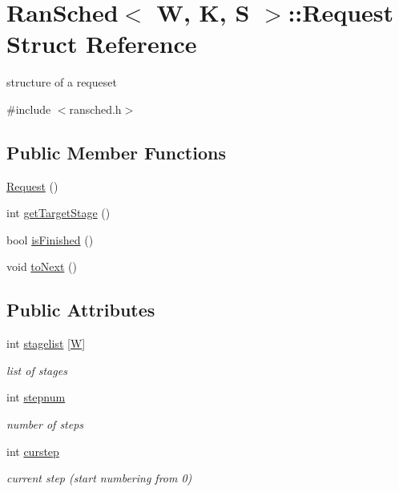 \hypertarget{structRanSched_1_1Request}{\section{Ran\-Sched$<$ W, K, S $>$\-:\-:Request Struct Reference}
\label{structRanSched_1_1Request}
}


structure of a requeset  




{\ttfamily \#include $<$ransched.\-h$>$}

\subsection*{Public Member Functions}
\begin{DoxyCompactItemize}
\item 
\hyperlink{structRanSched_1_1Request_a00c4929dc2bf873a72f7f528106be5be}{Request} ()
\item 
int \hyperlink{structRanSched_1_1Request_afad77c02cfcce0babe4db6ec59cbb678}{get\-Target\-Stage} ()
\item 
bool \hyperlink{structRanSched_1_1Request_a1b808be183e56cb16192f5ed87a2eabd}{is\-Finished} ()
\item 
void \hyperlink{structRanSched_1_1Request_a7e15dd870894d4eaf97fde10b125321e}{to\-Next} ()
\end{DoxyCompactItemize}
\subsection*{Public Attributes}
\begin{DoxyCompactItemize}
\item 
int \hyperlink{structRanSched_1_1Request_a033a82891f624a31b06bd5d5878a5901}{stagelist} \mbox{[}\hyperlink{test__u128_8cpp_ab21b528bc38899d04d3a7053e52fb797}{W}\mbox{]}
\begin{DoxyCompactList}\small\item\em list of stages \end{DoxyCompactList}\item 
int \hyperlink{structRanSched_1_1Request_a4c27e0f3554eb44342f5fdbfe5811499}{stepnum}
\begin{DoxyCompactList}\small\item\em number of steps \end{DoxyCompactList}\item 
int \hyperlink{structRanSched_1_1Request_ad43ebb667d1ca49c3e55a002ac97a98a}{curstep}
\begin{DoxyCompactList}\small\item\em current step (start numbering from 0) \end{DoxyCompactList}\end{DoxyCompactItemize}



